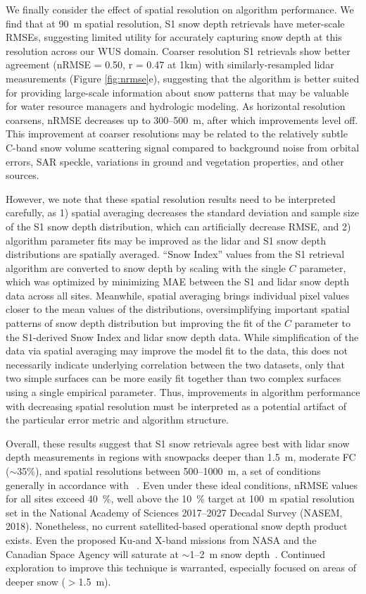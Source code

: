 \documentclass[journal abbreviation, manuscript]{copernicus}
\begin{document}
We finally consider the effect of spatial resolution on algorithm performance. We find that at 90~m spatial resolution, S1 snow depth retrievals have meter-scale RMSEs, suggesting limited utility for accurately capturing snow depth at this resolution across our WUS domain. Coarser resolution S1 retrievals show better agreement (nRMSE = 0.50, r = 0.47 at 1km) with similarly-resampled lidar measurements (Figure \ref{fig:nrmse}e), suggesting that the algorithm is better suited for providing large-scale information about snow patterns that may be valuable for water resource managers and hydrologic modeling. As horizontal resolution coarsens, nRMSE decreases up to 300--500~m, after which improvements level off. This improvement at coarser resolutions may be related to the relatively subtle C-band snow volume scattering signal compared to background noise from orbital errors, SAR speckle, variations in ground and vegetation properties, and other sources. 

However, we note that these spatial resolution results need to be interpreted carefully, as 1) spatial averaging decreases the standard deviation and sample size of the S1 snow depth distribution, which can artificially decrease RMSE, and 2) algorithm parameter fits may be improved as the lidar and S1 snow depth distributions are spatially averaged. ``Snow Index'' values from the S1 retrieval algorithm are converted to snow depth by scaling with the single $C$ parameter, which was optimized by minimizing MAE between the S1 and lidar snow depth data across all sites. Meanwhile, spatial averaging brings individual pixel values closer to the mean values of the distributions, oversimplifying important spatial patterns of snow depth distribution but improving the fit of the $C$ parameter to the S1-derived Snow Index and lidar snow depth data. While simplification of the data via spatial averaging may improve the model fit to the data, this does not necessarily indicate underlying correlation between the two datasets, only that two simple surfaces can be more easily fit together than two complex surfaces using a single empirical parameter. Thus, improvements in algorithm performance with decreasing spatial resolution must be interpreted as a potential artifact of the particular error metric and algorithm structure.  

Overall, these results suggest that S1 snow retrievals agree best with lidar snow depth measurements in regions with snowpacks deeper than 1.5~m, moderate FC ($\sim$35\%), and spatial resolutions between 500--1000~m, a set of conditions generally in accordance with ~\citet{Lievens.2022}. Even under these ideal conditions, nRMSE values for all sites exceed 40~\%, well above the 10~\% target at 100~m spatial resolution set in the National Academy of Sciences 2017--2027 Decadal Survey (NASEM, 2018)\nocite{Sciences.2018}. Nonetheless, no current satellited-based operational snow depth product exists. Even the proposed Ku-and X-band missions from NASA and the Canadian Space Agency will saturate at $\sim$1--2~m snow depth~\cite{Tsang.2022}. Continued exploration to improve this technique is warranted, especially focused on areas of deeper snow ($>$1.5~m). 
\end{document}
